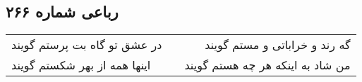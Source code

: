 \begin{center}
\section*{رباعی شماره ۲۶۶}
\label{sec:sh266}
\begin{longtable}{l p{0.5cm} r}
در عشق تو گاه بت پرستم گویند
&&
گه رند و خراباتی و مستم گویند
\\
اینها همه از بهر شکستم گویند
&&
من شاد به اینکه هر چه هستم گویند
\\
\end{longtable}
\end{center}
